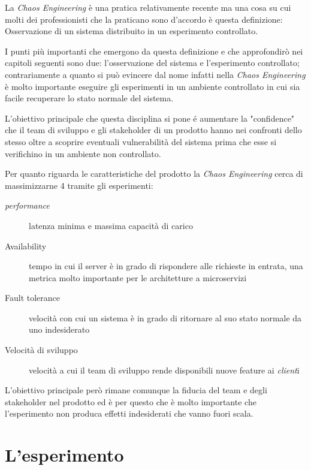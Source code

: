 La \textit{Chaos Engineering} è una pratica relativamente recente ma una cosa su cui molti dei professionisti che la praticano sono d'accordo è questa definizione: Osservazione di un sistema distribuito in un esperimento controllato.

I punti più importanti che emergono da questa definizione e che approfondirò nei capitoli seguenti sono due: l'osservazione del sistema e l'esperimento controllato; contrariamente a quanto si può evincere dal nome infatti nella \textit{Chaos Engineering} è molto importante eseguire gli esperimenti in un ambiente controllato in cui sia facile recuperare lo stato normale del sistema.

L'obiettivo principale che questa disciplina si pone é aumentare la "confidence" che il team di sviluppo e gli stakeholder di un prodotto hanno nei confronti dello stesso oltre a scoprire eventuali vulnerabilità del sistema prima che esse si verifichino in un ambiente non controllato.

Per quanto riguarda le caratteristiche del prodotto la \textit{Chaos Engineering} cerca di massimizzarne 4 tramite gli esperimenti:
\begin{description}
    \item[\textit{performance}] latenza minima e massima capacità di carico
    \item[Availability] tempo in cui il server è in grado di rispondere alle richieste in entrata, una metrica molto importante per le architetture a microservizi
    \item[Fault tolerance] velocità con cui un sistema è in grado di ritornare al suo stato normale da uno indesiderato
    \item[Velocità di sviluppo] velocità a cui il team di sviluppo rende disponibili nuove feature ai \textit{client}i
\end{description}
L'obiettivo principale però rimane comunque la fiducia del team e degli stakeholder nel prodotto ed è per questo che è molto importante che l'esperimento non produca effetti indesiderati che vanno fuori scala.

\section{L'esperimento}

